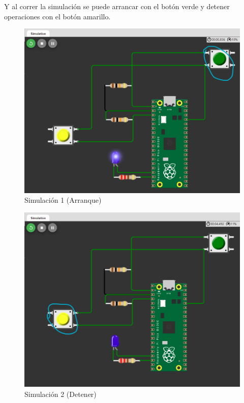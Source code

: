 \documentclass{article}
\begin{document}
    Y al correr la simulación se puede arrancar con el botón verde y detener operaciones con el botón amarillo.

    \begin{figure}[H]
        \centering
        \includegraphics[width=0.5\paperwidth]{images/wokwi-example-3-sim-1}
        \caption{Simulación 1 (Arranque)}
    \end{figure}

    \begin{figure}[H]
        \centering
        \includegraphics[width=0.5\paperwidth]{images/wokwi-example-3-sim-2}
        \caption{Simulación 2 (Detener)}
    \end{figure}
\end{document}
